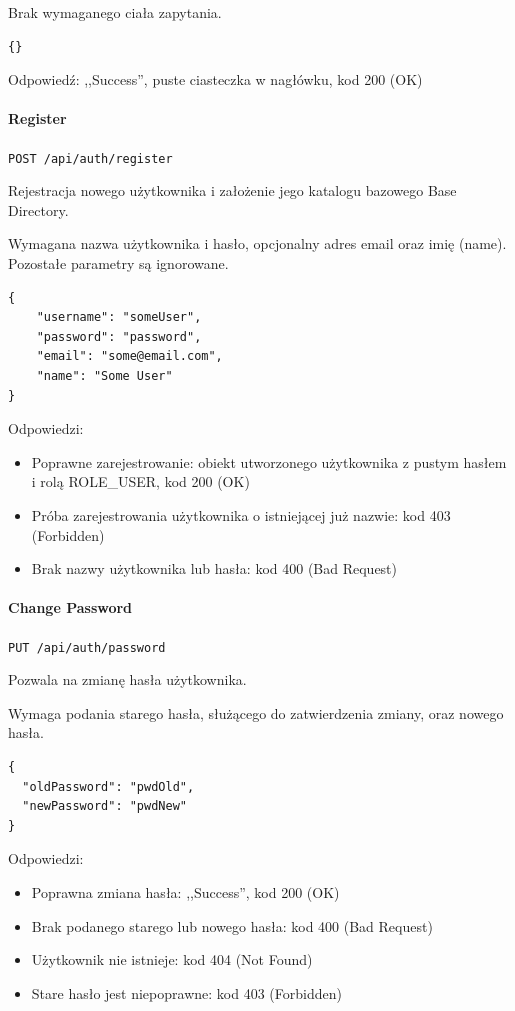 \documentclass[a4paper,twoside,12pt]{book}
\begin{document}
Brak wymaganego ciała zapytania.

\begin{verbatim}
{}
\end{verbatim}

Odpowiedź: ,,Success'', puste ciasteczka w nagłówku, kod 200 (OK)

\paragraph{Register}

\texttt{POST /api/auth/register}

Rejestracja nowego użytkownika i założenie jego katalogu bazowego Base Directory.

Wymagana nazwa użytkownika i hasło, opcjonalny adres email oraz imię (name). Pozostałe parametry są ignorowane.

\begin{verbatim}
{
    "username": "someUser",
    "password": "password",
    "email": "some@email.com",
    "name": "Some User"
}
\end{verbatim}

Odpowiedzi: 
\begin{itemize}
	\item Poprawne zarejestrowanie: obiekt utworzonego użytkownika z pustym hasłem i rolą ROLE\_USER, kod 200 (OK) 
	\item Próba zarejestrowania użytkownika o istniejącej już nazwie: kod 403 (Forbidden) 
	\item Brak nazwy użytkownika lub hasła: kod 400 (Bad Request)
\end{itemize}

\paragraph{Change Password}

\texttt{PUT /api/auth/password}

Pozwala na zmianę hasła użytkownika.

Wymaga podania starego hasła, służącego do zatwierdzenia zmiany, oraz nowego hasła.

\begin{verbatim}
{
  "oldPassword": "pwdOld",
  "newPassword": "pwdNew"
}
\end{verbatim}

Odpowiedzi: 
\begin{itemize}
	\item Poprawna zmiana hasła: ,,Success'', kod 200 (OK)
	\item Brak podanego starego lub nowego hasła: kod 400 (Bad Request) 
	\item Użytkownik nie istnieje: kod 404 (Not Found) 
	\item Stare hasło jest niepoprawne: kod 403 (Forbidden)
\end{itemize}
\end{document}
